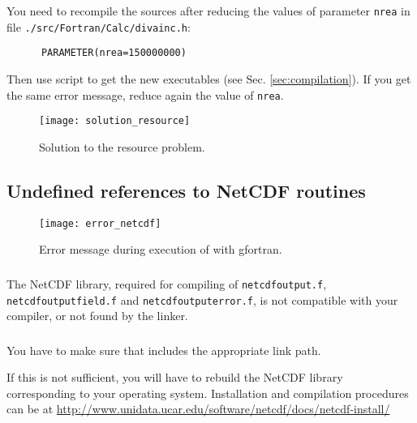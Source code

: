You need to recompile the sources after reducing the values of parameter \texttt{nrea} in file \texttt{./src/Fortran/Calc/divainc.h}:
\begin{verbatim}
      PARAMETER(nrea=150000000)
\end{verbatim}
Then use script  to get the new executables (see Sec. \ref{sec:compilation}). If you get the same error message, reduce again the value of \texttt{nrea}.

\begin{figure}[htpb]
\centering
\texttt{[image: solution\_resource]}
\caption{Solution to the resource problem.}
\end{figure}


\subsection{Undefined references to NetCDF routines\label{sec:error_netcdf}}

\begin{figure}[htpb]
\centering
\texttt{[image: error\_netcdf]}
\caption{Error message during execution of  with gfortran\label{fig:error_netcdf}.}
\end{figure}

\subsubsection{\question}

The NetCDF library, required for compiling of \texttt{netcdf\-output.f}, \texttt{netcdf\-output\-field.f} and \texttt{netcdf\-output\-error.f}, is not compatible with your compiler, or not found by the linker.

\subsubsection{\answer}

You have to make sure that  includes the appropriate link path.

If this is not sufficient, you will have to rebuild the NetCDF library corresponding to your operating system. Installation and compilation procedures can be at \url{http://www.unidata.ucar.edu/software/netcdf/docs/netcdf-install/}

